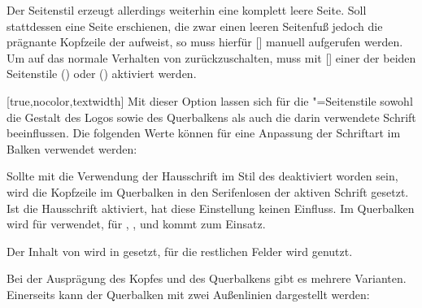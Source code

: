\begin{Declaration*}{}
\begin{Declaration*}{}
\begin{Declaration*}{}
\begin{Declaration}[v2.02]{}
\begin{Declaration}[v2.02]{}
\begin{Declaration}[v2.02]{}
Der Seitenstil  erzeugt allerdings weiterhin eine komplett 
leere Seite. Soll stattdessen eine Seite erschienen, die zwar einen leeren 
Seitenfuß jedoch die prägnante Kopfzeile der \TnUD aufweist, so muss hierfür  
[] manuell aufgerufen werden. 
Um auf das normale Verhalten von \KOMAScript{} zurückzuschalten, muss mit 
[] einer der beiden Seitenstile 
() oder 
() aktiviert werden.
%
\end{Declaration}
\end{Declaration}
\end{Declaration}

\begin{Declaration}[%
  v2.03;%
  v2.04!\Option{cdhead=barcolor}:nur farbig abgesetzter Querbalken;%
  v2.05!\Option{cdhead=date}:Datum zwischen Kopf- und Textbereich;%
]{}[true,nocolor,textwidth]
\printdeclarationlist%
%
%
%
%
%
Mit dieser Option lassen sich für die "=Seitenstile 
sowohl die Gestalt des Logos sowie des Querbalkens als auch die darin 
verwendete Schrift beeinflussen. Die folgenden Werte können für eine Anpassung 
der Schriftart im Balken verwendet werden:
%
\begin{values}{}
\itemfalse
  Sollte mit  die Verwendung der Hausschrift im Stil des 
  \TUDCDs deaktiviert worden sein, wird die Kopfzeile im Querbalken in den 
  Serifenlosen der aktiven Schrift gesetzt. Ist die Hausschrift aktiviert, 
  hat diese Einstellung keinen Einfluss.
  Im Querbalken wird für   
  verwendet, für , , 
   und  kommt  zum 
  Einsatz.
\item[heavy/heavyfont]
  Der Inhalt von  wird in  gesetzt, für 
  die restlichen Felder wird  genutzt.
\end{values}
%
Bei der Ausprägung des Kopfes und des Querbalkens gibt es mehrere Varianten. 
Einerseits kann der Querbalken mit zwei Außenlinien dargestellt werden:
%
\begin{values}{}
\item[nocolor/monochrome]

\end{values}
\end{Declaration}
\end{Declaration*}
\end{Declaration*}
\end{Declaration*}
